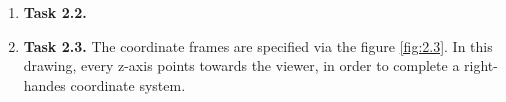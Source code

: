 \documentclass[a4paper,11pt]{article}
\begin{document}
\begin {enumerate}
\begin{enumerate}
        For the second rotation around $x_3$ by $\theta_4$, we append the rotation matrix to the right side of ${^0T_3}$.
        \begin{align*}
        	{^0T_3}'' &= {^0T_3} \cdot Rot_{x_3}(\theta_4)\\
        	&= \begin{bmatrix}
			-1 & 0 & 0 & C_1a_1 - C_{3}a_2 - a_3\\
			0 & -1 & 0 & S_1a_1 + S_{3}a_2\\
			0 & 0 & 1 & 0\\
			0 & 0 & 0 & 1
		\end{bmatrix} \begin{bmatrix}
			1 & 0 & 0 & 0\\
			0 & C_4 & -S_4 & 0\\
			0 & S_4 & C_4 & 0\\
			0 & 0 & 0 & 1
		\end{bmatrix}\\
			&= \begin{bmatrix}
			-1 & 0 & 0 & C_1a_1 - C_{3}a_2 - a_3\\
			0 & -C_4 & S_4 & S_1a_1+S_3a_2\\
			0 & S_4 & C_4 & 0\\
			0 & 0 & 0 & 1
		\end{bmatrix}
        \end{align*}
        
    \end{enumerate}

\item[\textbf{Task 2.2.}]


\item[\textbf{Task 2.3.}] The coordinate frames are specified via the figure \ref{fig:2.3}. In this drawing, every z-axis points towards the viewer, in order to complete a right-handes coordinate system.
	

\end{enumerate}
\end{document}
